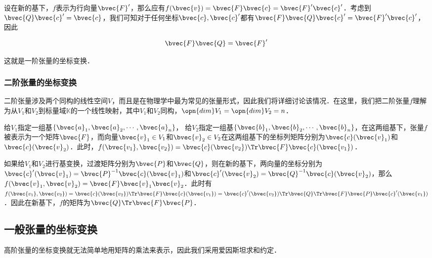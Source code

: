 设在新的基下，$f$表示为行向量$\bvec{F}'$，那么应有$f(\bvec{v})=\bvec{F}\bvec{c}=\bvec{F}'\bvec{c}'$．考虑到$\bvec{Q}\bvec{c}'=\bvec{c}$，我们可知对于任何坐标$\bvec{c}, \bvec{c}'$都有$\bvec{F}\bvec{Q}\bvec{c}'=\bvec{F}'\bvec{c}'$，因此

\begin{equation}
\bvec{F}\bvec{Q}=\bvec{F}'
\end{equation}

这就是一阶张量的坐标变换．
\subsubsection{二阶张量的坐标变换}

二阶张量涉及两个同构的线性空间$V$，而且是在物理学中最为常见的张量形式，因此我们将详细讨论该情况．在这里，我们把二阶张量$f$理解为从$V_1$和$V_2$到标量域$\mathbb{K}$的一个线性映射，其中$V_1$和$V_2$同构，$\opn{dim}V_1=\opn{dim}V_2=n$．

给$V_1$指定一组基$\{\bvec{a}_1, \bvec{a}_2, \cdots, \bvec{a}_n\}$， 给$V_2$指定一组基$\{\bvec{b}_1, \bvec{b}_2, \cdots, \bvec{b}_n\}$，在这两组基下，张量$f$被表示为一个矩阵$\bvec{F}$，而向量$\bvec{v}_1\in V_1$和$\bvec{v}_2\in V_2$在这两组基下的坐标列矩阵分别为$\bvec{c}(\bvec{v}_1)$和$\bvec{c}(\bvec{v}_2)$．此时，$f(\bvec{v_1},\bvec{v_2})=\bvec{c}(\bvec{v_2})\Tr\bvec{F}\bvec{c}(\bvec{v_1})$．

如果给$V_1$和$V_2$进行基变换，过渡矩阵分别为$\bvec{P}$和$\bvec{Q}$，则在新的基下，两向量的坐标分别为$\bvec{c}'(\bvec{v}_1)=\bvec{P}^{-1}\bvec{c}(\bvec{v}_1)$和$\bvec{c}'(\bvec{v}_2)=\bvec{Q}^{-1}\bvec{c}(\bvec{v}_2)$，那么$f(\bvec{v}_1, \bvec{v}_2)=\bvec{F}\bvec{v}_1\bvec{v}_2$．此时有$f(\bvec{v_1},\bvec{v_2})=\bvec{c}(\bvec{v_2})\Tr\bvec{F}\bvec{c}(\bvec{v_1})=\bvec{c}'(\bvec{v_2})\Tr\bvec{Q}\Tr\bvec{F}\bvec{P}\bvec{c}'(\bvec{v_1})$．因此在新基下，$f$的矩阵为$\bvec{Q}\Tr\bvec{F}\bvec{P}$．



\subsection{一般张量的坐标变换}

高阶张量的坐标变换就无法简单地用矩阵的乘法来表示，因此我们采用爱因斯坦求和约定．

\








